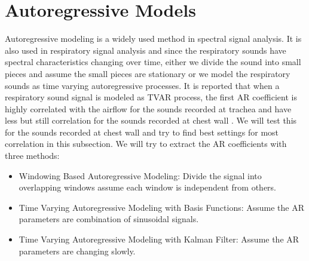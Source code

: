 \section{Autoregressive Models}
Autoregressive modeling is a widely used method in spectral signal analysis. It is also used in respiratory signal analysis and since the respiratory sounds have spectral characteristics changing over time, either we divide the sound into small pieces and assume the small pieces are stationary or we model the respiratory sounds as time varying autoregressive processes. It is reported that when a respiratory sound signal is modeled as TVAR process, the first AR coefficient is highly correlated with the airflow for the sounds recorded at trachea and have less but still correlation for the sounds recorded at chest wall \cite{koray-ieee-embs}. We will test this for the sounds recorded at chest wall and try to find best settings for most correlation in this subsection. We will try to extract the AR coefficients with three methods:
\begin{itemize}
	\item Windowing Based Autoregressive Modeling: Divide the signal into overlapping windows assume each window is independent from others.
	\item Time Varying Autoregressive Modeling with Basis Functions: Assume the AR parameters are combination of sinusoidal signals. 
	\item Time Varying Autoregressive Modeling with Kalman Filter: Assume the AR parameters are changing slowly.
\end{itemize}
